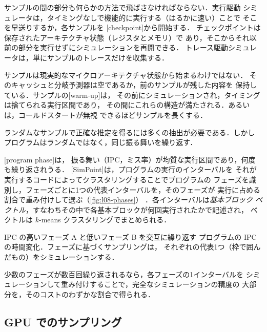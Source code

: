 \documentclass[../main.tex]{subfiles}
\begin{document}
サンプルの間の部分も何らかの方法で飛ばさなければならない．実行駆動
シミュレータは，タイミングなしで機能的に実行する（はるかに速い）ことで
そこを早送りするか，各サンプルを
[checkpoint]から開始する．
チェックポイントは保存されたアーキテクチャ状態（レジスタとメモリ）で
あり，そこからそれ以前の部分を実行せずにシミュレーションを再開できる．
トレース駆動シミュレータは，単にサンプルのトレースだけを収集する．

サンプルは現実的なマイクロアーキテクチャ状態から始まるわけではない．
そのキャッシュと分岐予測器は空であるか，前のサンプルが残した内容を
保持している．サンプルの[warm-up]は，
その前にシミュレーションされ，タイミングは捨てられる実行区間であり，
その間にこれらの構造が満たされる．あるいは，コールドスタートが無視
できるほどサンプルを長くする．

ランダムなサンプルで正確な推定を得るには多くの抽出が必要である．しかし
プログラムはランダムではなく，同じ振る舞いを繰り返す．

\begin{definition}
  \label{def:l08-phase}
  [program phase]は，
  振る舞い（IPC，ミス率）が均質な実行区間であり，何度も繰り返されうる．
  [SimPoint]は，プログラムの実行のインターバルを
  それが実行するコードによってクラスタリングすることでプログラムの
  フェーズを識別し，フェーズごとに1つの代表インターバルを，そのフェーズが
  実行に占める割合で重み付けして選ぶ（\cref{fig:l08-phases}）
  \cite{sherwood2002simpoint}．各インターバルは\emph{基本ブロック
  ベクトル}，すなわちその中で各基本ブロックが何回実行されたかで記述され，
  ベクトルは $k$-means クラスタリングでまとめられる．
\end{definition}

\begin{marginfigure}
  \resizebox{\linewidth}{!}{}
  \caption{IPC の高いフェーズ A と低いフェーズ B を交互に繰り返す
    プログラムの IPC の時間変化．フェーズに基づくサンプリングは，
    それぞれの代表1つ（枠で囲んだもの）をシミュレーションする．}
  \label{fig:l08-phases}
\end{marginfigure}

少数のフェーズが数百回繰り返されるなら，各フェーズの1インターバルを
シミュレーションして重み付けすることで，完全なシミュレーションの精度の
大部分を，そのコストのわずかな割合で得られる．

\subsection{GPU でのサンプリング}
\end{document}
